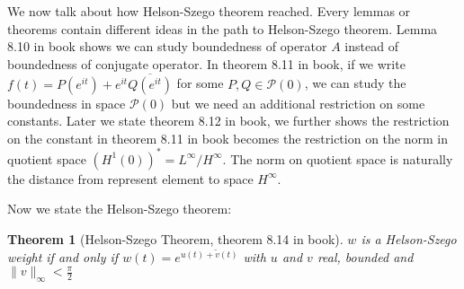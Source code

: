 \documentclass{report}
\newtheorem{theorem}{Theorem}
\numberwithin{theorem}{subsection}
\numberwithin{remark}{subsection}
\newcommand{\norm}[1]{\lVert#1\rVert}
\begin{document}
We now talk about how Helson-Szego theorem reached. Every lemmas or theorems contain different ideas in the path to Helson-Szego theorem.
Lemma 8.10 in book shows we can study boundedness of operator $A$ instead of boundedness of conjugate operator. In theorem 8.11 in book, if we write $f(t)=P(e^{it})+e^{it}\overline{Q(e^{it})}$ for some
$P,Q\in\mathscr{P}(0)$, we can study the boundedness in space $\mathscr{P}(0)$ but we need an additional restriction on some constants.
Later we state theorem 8.12 in book, we further shows the restriction on the constant in theorem 8.11 in book becomes the restriction on the norm in quotient space $(H^1(0))^*=L^\infty/ H^\infty$.
The norm on quotient space is naturally the distance from represent element to space $H^\infty$.\par
Now we state the Helson-Szego theorem:
\begin{theorem}[Helson-Szego Theorem, theorem 8.14 in book]
    $w$ is a Helson-Szego weight if and only if $w(t)=e^{u(t)+\tilde{v}(t)}$ with $u$ and $v$ real, bounded and $\norm{v}_\infty<\frac{\pi}{2}$
\end{theorem}
\end{document}
